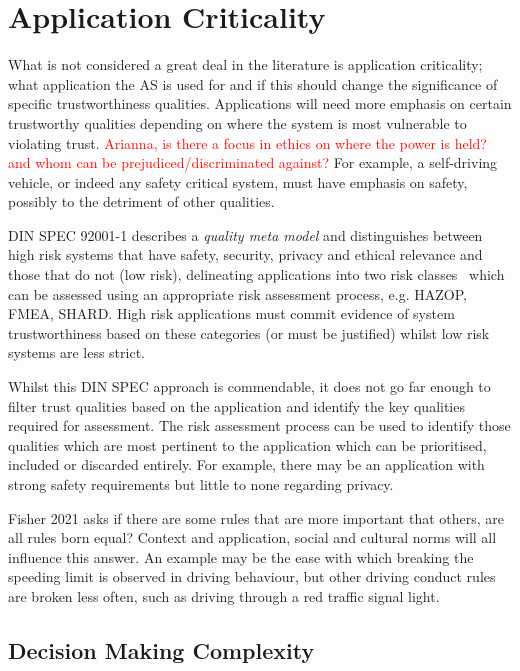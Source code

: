 \section{Application Criticality} \label{sec:appcrit}

What is not considered a great deal in the literature is application criticality; what application the AS is used for and if this should change the significance of specific trustworthiness qualities. Applications will need more emphasis on certain trustworthy qualities depending on where the system is most vulnerable to violating trust. 
%
\textcolor{red}{Arianna, is there a focus in ethics on where the power is held? and whom can be prejudiced/discriminated against?} 
%
For example, a self-driving vehicle, or indeed any safety critical system, must have emphasis on safety, possibly to the detriment of other qualities. 

DIN SPEC 92001-1 describes a \emph{quality meta model} and distinguishes between high risk systems that have safety, security, privacy and ethical relevance and those that do not (low risk), delineating applications into two risk classes~\cite{Englisch2019} which can be assessed using an appropriate risk assessment process, e.g. HAZOP, FMEA, SHARD. High risk applications must commit evidence of system trustworthiness based on these categories (or must be justified) whilst low risk systems are less strict.

Whilst this DIN SPEC approach is commendable, it does not go far enough to filter trust qualities based on the application and identify the key qualities required for assessment. The risk assessment process can be used to identify those qualities which are most pertinent to the application which can be prioritised, included or discarded entirely. For example, there may be an application with strong safety requirements but little to none regarding privacy. 

Fisher 2021 asks if there are some rules that are more important that others, are all rules born equal? Context and application, social and cultural norms will all influence this answer. An example may be the ease with which breaking the speeding limit is observed in driving behaviour, but other driving conduct rules are broken less often, such as driving through a red traffic signal light.

\subsection{Decision Making Complexity} \label{sec:appcrit-dec}

